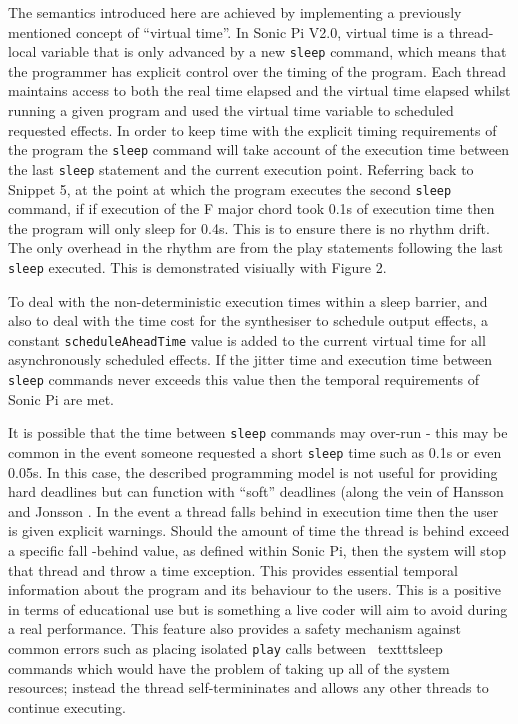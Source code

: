 \documentclass[11pt]{scrartcl}
\begin{document}
The semantics introduced here are achieved by implementing a previously 
mentioned concept of ``virtual time''. In Sonic Pi V2.0, virtual time is a 
thread-local variable that is only advanced by a new \texttt{sleep} command, 
which means that the programmer has explicit control over the timing of the 
program. Each thread maintains access to both the real time elapsed and the 
virtual time elapsed whilst running a given program and used the virtual time 
variable to scheduled requested effects. In order to keep time with the 
explicit timing requirements of the program the \texttt{sleep} command will 
take account of the execution time between the last \texttt{sleep} statement 
and the current execution point. Referring back to Snippet 5, at the point at 
which the program executes the second \texttt{sleep} command, if if execution 
of the F major chord took 0.1s of execution time then the program will only 
sleep for 0.4s. This is to ensure there is no rhythm drift. The only overhead 
in the rhythm are from the play statements following the last \texttt{sleep} 
executed. This is demonstrated visiually with Figure 2.

To deal with the non-deterministic execution times within a sleep barrier, and 
also to deal with the time cost for the synthesiser to schedule output 
effects, a constant \texttt{scheduleAheadTime} value is added to the current 
virtual time for all asynchronously scheduled effects. If the jitter time and 
execution time between \texttt{sleep} commands never exceeds this value then 
the temporal requirements of Sonic Pi are met. 

It is possible that the time between \texttt{sleep} commands may over-run - 
this may be common in the event someone requested a short \texttt{sleep} time 
such as 0.1s or even 0.05s. In this case, the described programming model is 
not useful for providing hard deadlines but can function with ``soft'' 
deadlines (along the vein of Hansson and Jonsson \cite{HJ94}. In the event a 
thread falls behind in execution time then the user is given explicit 
warnings. Should the amount of time the thread is behind exceed a specific fall
-behind value, as defined within Sonic Pi, then the system will stop that 
thread and throw a time exception. This provides essential temporal 
information about the program and its behaviour to the users. This is a 
positive in terms of educational use but is something a live coder will aim to 
avoid during a real performance. This feature also provides a safety mechanism 
against common errors such as placing isolated \texttt{play} calls between \
texttt{sleep} commands which would have the problem of taking up all of the 
system resources; instead the thread self-termininates and allows any other 
threads to continue executing.
\end{document}
